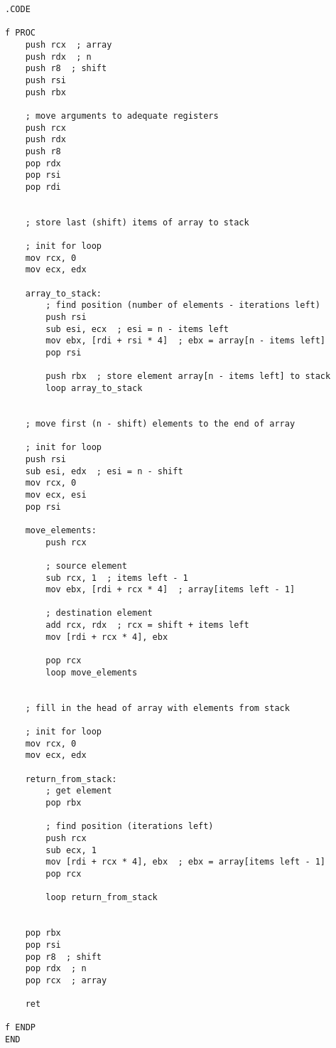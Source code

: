 \begin{lstlisting}[language={[x86masm]Assembler}, caption={Ассемблерная вставка на синтаксисе Intel}]
.CODE

f PROC
    push rcx  ; array
    push rdx  ; n
    push r8  ; shift
    push rsi
    push rbx

    ; move arguments to adequate registers
    push rcx
    push rdx
    push r8
    pop rdx
    pop rsi
    pop rdi


    ; store last (shift) items of array to stack

    ; init for loop
    mov rcx, 0
    mov ecx, edx
    
    array_to_stack:
        ; find position (number of elements - iterations left)
        push rsi
        sub esi, ecx  ; esi = n - items left
        mov ebx, [rdi + rsi * 4]  ; ebx = array[n - items left]
        pop rsi

        push rbx  ; store element array[n - items left] to stack
        loop array_to_stack


    ; move first (n - shift) elements to the end of array

    ; init for loop
    push rsi
    sub esi, edx  ; esi = n - shift
    mov rcx, 0
    mov ecx, esi
    pop rsi

    move_elements:
        push rcx

        ; source element
        sub rcx, 1  ; items left - 1
        mov ebx, [rdi + rcx * 4]  ; array[items left - 1]

        ; destination element
        add rcx, rdx  ; rcx = shift + items left
        mov [rdi + rcx * 4], ebx

        pop rcx
        loop move_elements


    ; fill in the head of array with elements from stack

    ; init for loop
    mov rcx, 0
    mov ecx, edx

    return_from_stack:
        ; get element
        pop rbx

        ; find position (iterations left)
        push rcx
        sub ecx, 1
        mov [rdi + rcx * 4], ebx  ; ebx = array[items left - 1]
        pop rcx

        loop return_from_stack


    pop rbx
    pop rsi
    pop r8  ; shift
    pop rdx  ; n
    pop rcx  ; array

    ret

f ENDP
END
\end{lstlisting}

